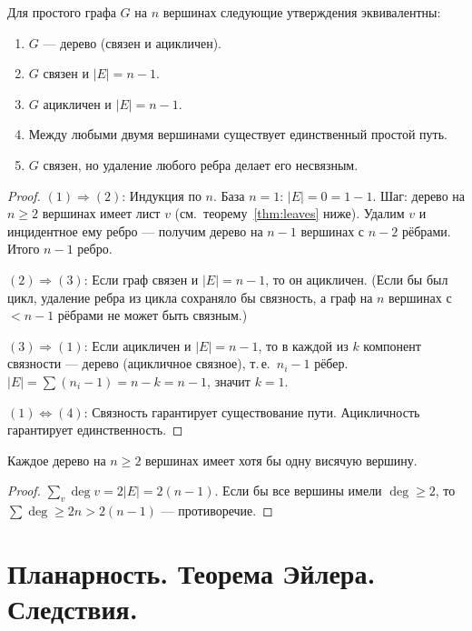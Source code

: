 \documentclass[12pt]{article}
\begin{document}
\begin{theorem}
Для простого графа $G$ на $n$ вершинах следующие утверждения
эквивалентны:
\begin{enumerate}[(1)]
\item $G$ --- дерево (связен и ацикличен).
\item $G$ связен и $|E| = n-1$.
\item $G$ ацикличен и $|E| = n-1$.
\item Между любыми двумя вершинами существует единственный простой путь.
\item $G$ связен, но удаление любого ребра делает его несвязным.
\end{enumerate}
\end{theorem}

\begin{proof}
$(1) \Rightarrow (2)$: Индукция по $n$.
База $n=1$: $|E|=0=1-1$. Шаг: дерево на $n \geq 2$ вершинах имеет лист $v$ (см.~теорему~\ref{thm:leaves} ниже). Удалим $v$ и инцидентное ему ребро --- получим дерево на $n-1$ вершинах с $n-2$ рёбрами. Итого $n-1$ ребро.

$(2) \Rightarrow (3)$: Если граф связен и $|E|=n-1$, то он ацикличен.
(Если бы был цикл, удаление ребра из цикла сохраняло бы связность,
а граф на $n$ вершинах с $< n-1$ рёбрами не может быть связным.)

$(3) \Rightarrow (1)$: Если ацикличен и $|E|=n-1$,
то в каждой из $k$ компонент связности --- дерево (ацикличное связное),
т.\,е.\ $n_i - 1$ рёбер. $|E| = \sum(n_i - 1) = n - k = n-1$,
значит $k = 1$.

$(1) \Leftrightarrow (4)$: Связность гарантирует существование пути.
Ацикличность гарантирует единственность.
\end{proof}

\begin{theorem}\label{thm:leaves}
Каждое дерево на $n \geq 2$ вершинах имеет хотя бы одну висячую вершину.
\end{theorem}

\begin{proof}
$\sum_{v}\deg v = 2|E| = 2(n-1)$.
Если бы все вершины имели $\deg \geq 2$, то
$\sum \deg \geq 2n > 2(n-1)$ --- противоречие.
\end{proof}

\section{Планарность. Теорема Эйлера. Следствия.}
\end{document}
